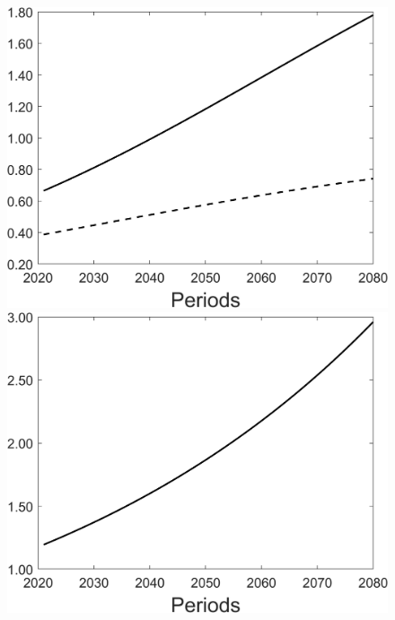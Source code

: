 \begin{figure}[h!!]
\begin{minipage}[]{0.32\textwidth}
\end{minipage}
\begin{minipage}[]{0.32\textwidth}
	\includegraphics[width=1\textwidth]{../../codding_model/Own/figures/Rep_agent/staticBAU_LF_separate_pc_periods59_eppsilon0.40_zeta1.40_Ad08_Ac04_thetac0.70_thetad0.56_HetGrowth1_tauul0.181_util0_withtarget0_lgd0.png}
\end{minipage}
	\begin{minipage}[]{0.32\textwidth}
		\includegraphics[width=1\textwidth]{../../codding_model/Own/figures/Rep_agent/staticBAU_LF_separate_ydyc_periods59_eppsilon0.40_zeta1.40_Ad08_Ac04_thetac0.70_thetad0.56_HetGrowth1_tauul0.181_util0_withtarget0_lgd0.png}
	\end{minipage}
\end{figure}

